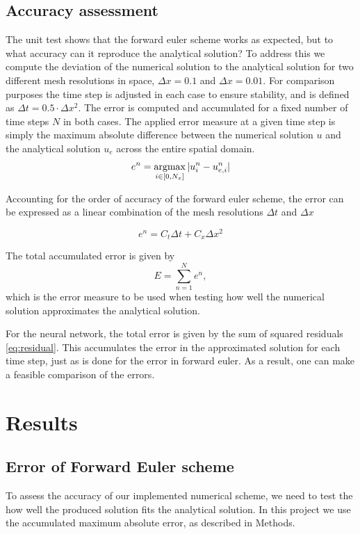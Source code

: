 \documentclass[12pt]{extarticle}
\begin{document}
\subsection*{Accuracy assessment}
The unit test shows that the forward euler scheme works as expected, but to what accuracy can it reproduce the analytical solution? To address this we compute the deviation of the numerical solution to the analytical solution for two different mesh resolutions in space, $\Delta x=0.1$ and $\Delta x = 0.01$. For comparison purposes the time step is adjusted in each case to ensure stability, and is defined as $\Delta t = 0.5\cdot \Delta x^2$. The error is computed and accumulated for a fixed number of time steps $N$ in both cases. The applied error measure at a given time step is simply the maximum absolute difference between the numerical solution $u$ and the analytical solution $u_e$ across the entire spatial domain.
\[ e^n = \operatorname*{argmax}_{i \in [0,N_x]} |u_i^n - u_{e,i}^n| \]

Accounting for the order of accuracy of the forward euler scheme, the error can be expressed as a linear combination of the mesh resolutions $\Delta t$ and $\Delta x$ \cite{Linge2017}

\[ e^n = C_t\Delta t + C_x\Delta x^2 \]

The total accumulated error is given by
\[ E = \sum_{n=1}^N e^n, \]
which is the error measure to be used when testing how well the numerical solution approximates the analytical solution.

\par For the neural network, the total error is given by the sum of squared residuals \ref{eq:residual}. This accumulates the error in the approximated solution for each time step, just as is done for the error in forward euler. As a result, one can make a feasible comparison of the errors.



\section{Results}

\subsection*{Error of Forward Euler scheme}

To assess the accuracy of our implemented numerical scheme, we need to test the how well the produced solution fits the analytical solution. In this project we use the accumulated maximum absolute error, as described in Methods.
\end{document}
